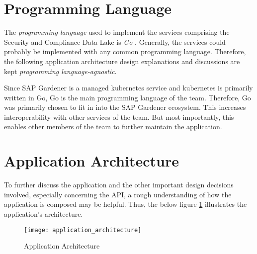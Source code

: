 \section{Programming Language}
The \emph{programming language} used to implement the services comprising the Security and Compliance Data Lake is \emph{Go} \cite{Golang}. Generally, the services could probably be implemented with any common programming language. Therefore, the following application architecture design explanations and discussions are kept \emph{programming language-agnostic}.\par 
Since SAP Gardener is a managed kubernetes service and kubernetes is primarily written in Go, Go is the main programming language of the team. Therefore, Go was primarily chosen to fit in into the SAP Gardener ecosystem. This increases interoperability with other services of the team. But most importantly, this enables other members of the team to further maintain the application. 

\section{Application Architecture}
To further discuss the application and the other important design decisions involved, especially concerning the API, a rough understanding of how the application is composed may be helpful. Thus, the below figure \ref{fig:ApplicationArchitecture} illustrates the application's architecture. 

\begin{figure}[H]
	\centering
	\texttt{[image: application\_architecture]}
	\caption[Application Architecture]{Application Architecture }
	\label{fig:ApplicationArchitecture}
\end{figure}

